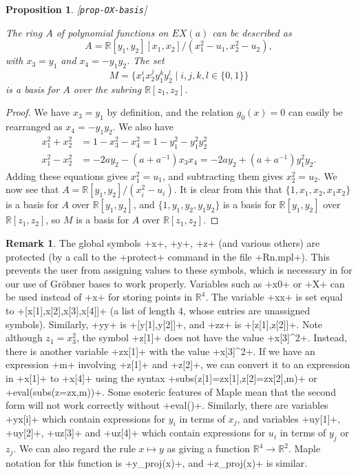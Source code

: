 \documentclass[reqno]{amsart}
\newcommand{\lbl}[1]{\label{#1}\textup{[\texttt{#1}]}\par}
\newcommand{\lbl}{\label}
\newcommand{\R}         {{\mathbb{R}}}
\newcommand{\st}        {\;|\;}
\renewcommand{\:}{\colon}
\newtheorem{proposition}[theorem]{Proposition}
\theoremstyle{definition}
\newtheorem{remark}[theorem]{Remark}
\begin{document}
\begin{proposition}\lbl{prop-OX-basis}
 The ring $A$ of polynomial functions on $EX(a)$ can be described as
 \[ A = \R[y_1,y_2][x_1,x_2]/(x_1^2-u_1,x_2^2-u_2), \]
 with $x_3=y_1$ and $x_4=-y_1y_2$.  The set
 \[ M = \{x_1^ix_2^jy_1^ky_2^l\st i,j,k,l\in\{0,1\}\} \]
 is a basis for $A$ over the subring $\R[z_1,z_2]$.
\end{proposition}
\begin{proof}
 We have $x_3=y_1$ by definition, and the relation $g_0(x)=0$ can
 easily be rearranged as $x_4=-y_1y_2$.  We also have
 \begin{align*}
  x_1^2+x_2^2 &= 1-x_3^2-x_4^2 = 1-y_1^2-y_1^2y_2^2 \\
  x_1^2-x_2^2 &= -2ay_2-(a+a^{-1})x_3x_4
               = -2ay_2+(a+a^{-1})y_1^2y_2.
 \end{align*}
 Adding these equations gives $x_1^2=u_1$, and subtracting them gives
 $x_2^2=u_2$.  We now see that $A=\R[y_1,y_2]/(x_i^2-u_i)$.  It is
 clear from this that $\{1,x_1,x_2,x_1x_2\}$ is a basis for $A$ over
 $\R[y_1,y_2]$, and $\{1,y_1,y_2,y_1y_2\}$ is a basis for
 $\R[y_1,y_2]$ over $\R[z_1,z_2]$, so $M$ is a basis for $A$ over
 $\R[z_1,z_2]$.
\end{proof}
\begin{remark}
 The global symbols \mcode+x+, \mcode+y+, \mcode+z+ (and various
 others) are protected (by a call to the \mcode+protect+ command in
 the file \fname+Rn.mpl+).  This prevents the user from assigning
 values to these symbols, which is necessary in for our use of
 Gr\"obner bases to work properly.  Variables such as \mcode+x0+ or
 \mcode+X+ can be used instead of \mcode+x+ for storing points in
 $\R^4$.  The variable \mcode+xx+ is set equal to
 \mcode+[x[1],x[2],x[3],x[4]]+ (a list of length $4$, whose entries
 are unassigned symbols).  Similarly, \mcode+yy+ is
 \mcode+[y[1],y[2]]+, and \mcode+zz+ is \mcode+[z[1],z[2]]+.  Note
 although $z_1=x_3^2$, the symbol \mcode+z[1]+ does not have the value
 \mcode+x[3]^2+.  Instead, there is another variable \mcode+zx[1]+
 with the value \mcode+x[3]^2+.  If we have an expression \mcode+m+
 involving \mcode+z[1]+ and \mcode+z[2]+, we can convert it to an
 expression in \mcode+x[1]+ to \mcode+x[4]+ using the syntax
 \mcode+subs({z[1]=zx[1],z[2]=zx[2]},m)+ or
 \mcode+eval(subs({z=zx},m))+.  Some esoteric features of Maple mean
 that the second form will not work correctly without \mcode+eval()+.
 Similarly, there are variables \mcode+yx[i]+ which contain
 expressions for $y_i$ in terms of $x_j$, and variables \mcode+uy[1]+,
 \mcode+uy[2]+, \mcode+uz[3]+ and \mcode+uz[4]+ which contain
 expressions for $u_i$ in terms of $y_j$ or $z_j$.  We can also regard
 the rule $x\mapsto y$ as giving a function $\R^4\to\R^2$.  Maple
 notation for this function is \mcode+y_proj(x)+, and
 \mcode+z_proj(x)+ is similar.
\end{remark}
\end{document}

